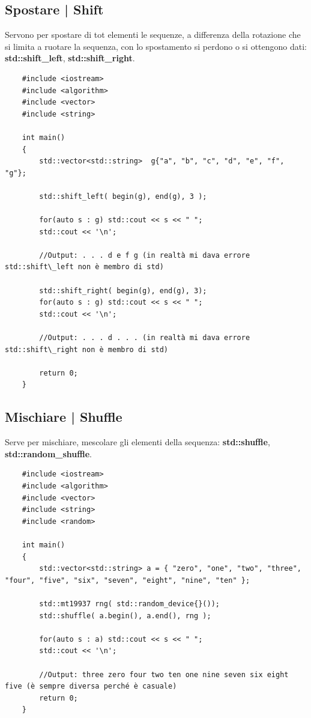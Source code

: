 \subsection{Spostare | Shift}

\textsf{\small Servono per spostare di tot elementi le sequenze, a differenza della rotazione che si limita a ruotare la sequenza, con lo spostamento si perdono o si ottengono dati: \textbf{std::shift\_left}, \textbf{std::shift\_right}.} \\

\begin{lstlisting}
	#include <iostream>
	#include <algorithm>
	#include <vector>
	#include <string>
	
	int main()
	{
		std::vector<std::string>  g{"a", "b", "c", "d", "e", "f", "g"};
		
		std::shift_left( begin(g), end(g), 3 );
		
		for(auto s : g) std::cout << s << " ";
		std::cout << '\n';
		
		//Output: . . . d e f g (in realtà mi dava errore std::shift\_left non è membro di std)
		
		std::shift_right( begin(g), end(g), 3);
		for(auto s : g) std::cout << s << " ";
		std::cout << '\n';
		
		//Output: . . . d . . . (in realtà mi dava errore std::shift\_right non è membro di std)
		
		return 0;
	}
\end{lstlisting}

\subsection{Mischiare | Shuffle}

\textsf{\small Serve per mischiare, mescolare gli elementi della sequenza: \textbf{std::shuffle}, \textbf{std::random\_shuffle}.} \\

\begin{lstlisting}
	#include <iostream>
	#include <algorithm>
	#include <vector>
	#include <string>
	#include <random>
	
	int main()
	{
		std::vector<std::string> a = { "zero", "one", "two", "three", "four", "five", "six", "seven", "eight", "nine", "ten" };
		
		std::mt19937 rng( std::random_device{}());
		std::shuffle( a.begin(), a.end(), rng );
		
		for(auto s : a) std::cout << s << " ";
		std::cout << '\n';
		
		//Output: three zero four two ten one nine seven six eight five (è sempre diversa perché è casuale)
		return 0;
	}
\end{lstlisting}

